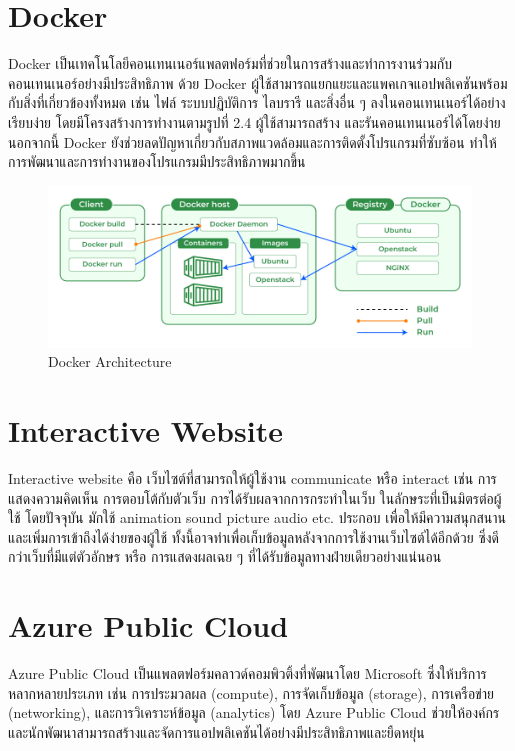 \section{Docker}
Docker \cite{docker} เป็นเทคโนโลยีคอนเทนเนอร์แพลตฟอร์มที่ช่วยในการสร้างและทำการงานร่วมกับคอนเทนเนอร์อย่างมีประสิทธิภาพ ด้วย Docker 
ผู้ใช้สามารถแยกแยะและแพคเกจแอปพลิเคชันพร้อมกับสิ่งที่เกี่ยวข้องทั้งหมด เช่น ไฟล์ ระบบปฏิบัติการ ไลบรารี และสิ่งอื่น ๆ 
ลงในคอนเทนเนอร์ได้อย่างเรียบง่าย โดยมีโครงสร้างการทำงานตามรูปที่ 2.4 ผู้ใช้สามารถสร้าง และรันคอนเทนเนอร์ได้โดยง่าย นอกจากนี้ Docker 
ยังช่วยลดปัญหาเกี่ยวกับสภาพแวดล้อมและการติดตั้งโปรแกรมที่ซับซ้อน ทำให้การพัฒนาและการทำงานของโปรแกรมมีประสิทธิภาพมากขึ้น 
\begin{figure}[ht]
  \begin{center}
  \includegraphics[scale=0.3]{resources/Docker.png}
  \end{center}
  \caption[Docker Architecture]{Docker Architecture}
  \label{fig:docker}
\end{figure}

\section{Interactive Website}
Interactive website \cite{interactive-web} คือ เว็บไซต์ที่สามารถให้ผู้ใช้งาน communicate หรือ interact เช่น การแสดงความคิดเห็น การตอบโต้กับตัวเว็บ 
การได้รับผลจากการกระทําในเว็บ ในลักษระที่เป็นมิตรต่อผู้ใช้ โดยปัจจุบัน มักใช้ animation sound picture audio etc. ประกอบ 
เพื่อให้มีความสนุกสนานและเพิ่มการเข้าถึงได้ง่ายของผู้ใช้ ทั้งนี้อาจทําเพื่อเก็บข้อมูลหลังจากการใช้งานเว็บไซต์ได้อีกด้วย ซึ่งดีกว่าเว็บที่มีแต่ตัวอักษร หรือ 
การแสดงผลเฉย ๆ ที่ได้รับข้อมูลทางฝ่ายเดียวอย่างแน่นอน

\section{Azure Public Cloud}
Azure Public Cloud \cite{azure} เป็นแพลตฟอร์มคลาวด์คอมพิวติ้งที่พัฒนาโดย Microsoft ซึ่งให้บริการหลากหลายประเภท เช่น การประมวลผล (compute), การจัดเก็บข้อมูล (storage), การเครือข่าย (networking), และการวิเคราะห์ข้อมูล (analytics) โดย Azure Public Cloud ช่วยให้องค์กรและนักพัฒนาสามารถสร้างและจัดการแอปพลิเคชันได้อย่างมีประสิทธิภาพและยืดหยุ่น

